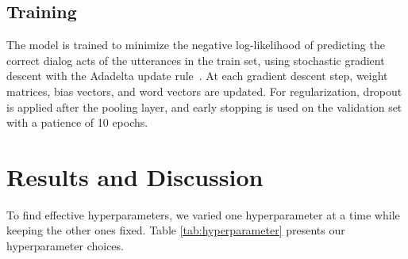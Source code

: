 \documentclass[11pt,letterpaper]{article}
\begin{document}
 \vspace{-0.5cm}


\subsection{Training} \label{sec:training}
The model is trained to minimize the negative log-likelihood of predicting the correct dialog acts of the utterances in the train set, using stochastic gradient descent with the Adadelta update rule~\cite{zeiler2012adadelta}.
At each gradient descent step, weight matrices, bias vectors, and word vectors are updated.
For regularization, dropout is applied after the pooling layer, and early stopping is used on the validation set with a patience of 10 epochs. 




















 \section{Results and Discussion}




To find effective hyperparameters, we varied one hyperparameter at a time while keeping the other ones fixed. Table \ref{tab:hyperparameter} presents our hyperparameter choices.
\end{document}
